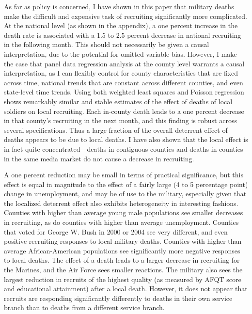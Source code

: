 \documentclass[12pt] {article}
\begin{document}
  As far as policy is concerned, I have shown in this paper that military deaths make the difficult and expensive task of recruiting significantly
more complicated. At the national level (as shown in the appendix), a one percent increase in
the death rate is associated with a 1.5 to 2.5 percent decrease in
national recruiting in the following month. This should not necessarily
be given a causal interpretation, due to the potential for omitted
variable bias. However, I make the case that panel data regression
analysis at the county level warrants a causal interpretation, as
I can flexibly control for county characteristics that are fixed across
time, national trends that are constant across different counties,
and even state-level time trends. Using both weighted least squares
and Poisson regression shows remarkably similar and stable estimates
of the effect of deaths of local soldiers on local recruiting. Each
in-county death leads to a one percent decrease in that county's recruiting
in the next month, and this finding is robust across several specifications.
Thus a large fraction of the overall deterrent effect of deaths appears
to be due to local deaths. I have also shown that the local effect
is in fact quite concentrated---deaths in contiguous counties and
deaths in counties in the same media market do not cause a decrease
in recruiting.

A one percent reduction may be small in terms of practical significance, but this effect is equal in magnitude to the effect of a fairly large (4 to 5 percentage point) change in unemployment, and may be of use to the military, especially given that the localized deterrent effect also exhibits heterogeneity in interesting fashions. Counties with higher than average young male populations
see smaller decreases in recruiting, as do counties with higher than
average unemployment. Counties that voted for George W. Bush in 2000
or 2004 see very different, and even positive recruiting responses
to local military deaths. Counties with higher than average African-American
populations see significantly more negative responses to local deaths.
The effect of a death leads to a larger decrease in recruiting for
the Marines, and the Air Force sees smaller reactions. The military
also sees the largest reduction in recruits of the highest quality
(as measured by AFQT score and educational attainment) after a local
death. However, it does not appear that recruits are responding significantly
differently to deaths in their own service branch than to deaths from
a different service branch. 
\end{document}
